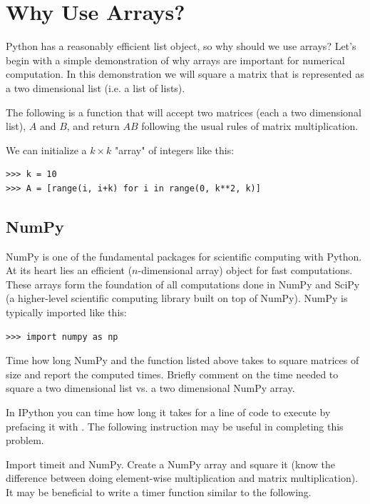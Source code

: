 \label{lab:NumPyArrays}

\section*{Why Use Arrays?} Python has a reasonably efficient list object, 
so why should we use arrays? Let's begin with a simple demonstration of why
arrays are important for numerical computation. In this demonstration 
we will square a matrix that is represented as a two dimensional list 
(i.e. a list of lists).

The following is a function that will accept two matrices (each a two
dimensional list), $A$ and $B$, and return $AB$ following the usual rules
of matrix multiplication. 



We can initialize a $k \times k$ "array" of integers like this:
\begin{lstlisting}
>>> k = 10 
>>> A = [range(i, i+k) for i in range(0, k**2, k)]
\end{lstlisting}

\subsection*{NumPy} NumPy is one of the fundamental packages for scientific
computing with Python. At its heart lies an efficient 
($n$-dimensional array) object for fast computations. These arrays form
the foundation of all computations done in NumPy and SciPy (a
higher-level scientific computing library built on top of NumPy). NumPy
is typically imported like this: 
\begin{lstlisting}
>>> import numpy as np
\end{lstlisting}

\begin{problem} Time how long NumPy and the  function 
listed above takes to square matrices of size  
and report the computed times. Briefly comment on the time needed to 
square a two dimensional list vs. a two dimensional NumPy array.

In IPython you can time how long it takes for a line of code to execute
by prefacing it with . The following instruction 
may be useful in completing this problem.

Import timeit and NumPy. Create a NumPy array and square it 
(know the difference between doing element-wise multiplication 
and matrix multiplication).
It may be beneficial to write a timer function similar to the following.


\end{problem}

